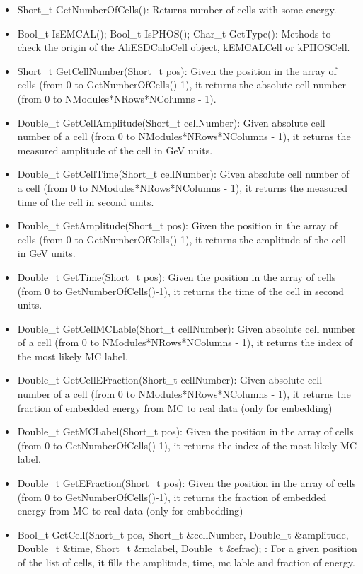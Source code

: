 \begin{itemize}

	\item Short\_t GetNumberOfCells(): Returns number of cells with some energy.
	
	\item Bool\_t IsEMCAL(); Bool\_t IsPHOS(); Char\_t  GetType(): Methods to check the origin of the AliESDCaloCell object, kEMCALCell or kPHOSCell.

	\item Short\_t  GetCellNumber(Short\_t pos):  Given the position in the array of cells (from 0 to GetNumberOfCells()-1), it returns the absolute cell number (from 0 to NModules*NRows*NColumns - 1).

	\item Double\_t GetCellAmplitude(Short\_t cellNumber): Given absolute cell number of a cell (from 0 to NModules*NRows*NColumns - 1), it returns the measured amplitude of the cell in GeV units.

	\item Double\_t GetCellTime(Short\_t cellNumber):  Given absolute cell number of a cell (from 0 to NModules*NRows*NColumns - 1), it returns the measured time of the cell in second units.

	\item Double\_t GetAmplitude(Short\_t pos): Given the position in the array of cells (from 0 to GetNumberOfCells()-1), it returns the amplitude of the cell in GeV units. 

	\item Double\_t GetTime(Short\_t pos):  Given the position in the array of cells (from 0 to GetNumberOfCells()-1), it returns the time of the cell in second units. 

	\item Double\_t GetCellMCLable(Short\_t cellNumber): Given absolute cell number of a cell (from 0 to NModules*NRows*NColumns - 1), it returns the index of the most likely MC label.

	\item Double\_t GetCellEFraction(Short\_t cellNumber):  Given absolute cell number of a cell (from 0 to NModules*NRows*NColumns - 1), it returns the fraction of embedded energy from MC to real data (only for embedding)

	\item  Double\_t GetMCLabel(Short\_t pos): Given the position in the array of cells (from 0 to GetNumberOfCells()-1), it returns the index of the most likely MC label.

	\item Double\_t GetEFraction(Short\_t pos):  Given the position in the array of cells (from 0 to GetNumberOfCells()-1), it returns the fraction of embedded energy from MC to real data (only for embbedding)

          \item Bool\_t   GetCell(Short\_t pos, Short\_t \&cellNumber, Double\_t \&amplitude, Double\_t \&time, Short\_t \&mclabel,    Double\_t  \&efrac); : For a given position of the list of cells, it fills the amplitude, time, mc lable and fraction of energy.
          
          
 \end{itemize}

